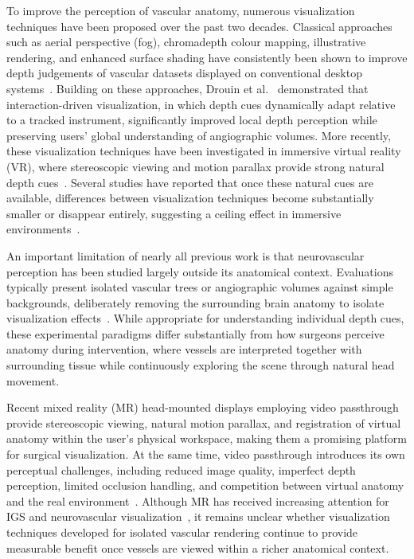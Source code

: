 \documentclass[runningheads]{llncs}
\begin{document}
To improve the perception of vascular anatomy, numerous visualization techniques have been proposed over the past two decades. Classical approaches such as aerial perspective (fog), chromadepth colour mapping, illustrative rendering, and enhanced surface shading have consistently been shown to improve depth judgements of vascular datasets displayed on conventional desktop systems~\cite{ropinski_visually_2006,kersten-oertel_evaluation_2014,behrendt_combining_2017}. Building on these approaches, Drouin et al.~\cite{drouin_interaction_2018} demonstrated that interaction-driven visualization, in which depth cues dynamically adapt relative to a tracked instrument, significantly improved local depth perception while preserving users' global understanding of angiographic volumes. More recently, these visualization techniques have been investigated in immersive virtual reality (VR), where stereoscopic viewing and motion parallax provide strong natural depth cues~\cite{hombeck_evaluating_2022}. Several studies have reported that once these natural cues are available, differences between visualization techniques become substantially smaller or disappear entirely, suggesting a ceiling effect in immersive environments~\cite{heinrich_estimating_2021,titov_effect_2021,lesar_evaluation_2024}.

An important limitation of nearly all previous work is that neurovascular perception has been studied largely outside its anatomical context. Evaluations typically present isolated vascular trees or angiographic volumes against simple backgrounds, deliberately removing the surrounding brain anatomy to isolate visualization effects~\cite{kersten-oertel_evaluation_2014,heinrich_estimating_2021,titov_effect_2021}. While appropriate for understanding individual depth cues, these experimental paradigms differ substantially from how surgeons perceive anatomy during intervention, where vessels are interpreted together with surrounding tissue while continuously exploring the scene through natural head movement.

Recent mixed reality (MR) head-mounted displays employing video passthrough provide stereoscopic viewing, natural motion parallax, and registration of virtual anatomy within the user's physical workspace, making them a promising platform for surgical visualization. At the same time, video passthrough introduces its own perceptual challenges, including reduced image quality, imperfect depth perception, limited occlusion handling, and competition between virtual anatomy and the real environment~\cite{adams_depth_2022,macedo_occlusion_2023,do_effects_2020}. Although MR has received increasing attention for IGS and neurovascular visualization~\cite{preim_survey_2016,kersten-oertel_augmented_2015}, it remains unclear whether visualization techniques developed for isolated vascular rendering continue to provide measurable benefit once vessels are viewed within a richer anatomical context.
\end{document}
